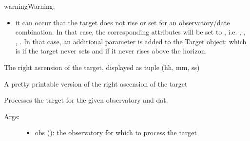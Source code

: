 \documentclass[letterpaper,10pt,english]{sphinxmanual}
\begin{document}
\begin{fulllineitems}
\begin{fulllineitems}
\begin{description}
\begin{itemize}
\end{itemize}

\end{description}

\begin{notice}{warning}{Warning:}\begin{itemize}
\item {} 
it can occur that the target does not rise or set for an observatory/date combination. In that case, the corresponding attributes will be set to , i.e. , , , . In that case, an additional parameter is added to the Target object:  which is  if the target never sets and  if it never rises above the horizon.

\end{itemize}
\end{notice}

\end{fulllineitems}


\begin{fulllineitems}
\label{astroobs:astroobs.Target.Target.ra}
The right ascension of the target, displayed as tuple (hh, mm, ss)

\end{fulllineitems}


\begin{fulllineitems}
\label{astroobs:astroobs.Target.Target.raStr}
A pretty printable version of the right ascension of the target

\end{fulllineitems}


\begin{fulllineitems}
\label{astroobs:astroobs.Target.Target.whenobs}
Processes the target for the given observatory and dat.
\begin{description}
\item[{Args:}] \leavevmode\begin{itemize}
\item {} 
obs (): the observatory for which to process the target


\end{itemize}
\end{description}
\end{fulllineitems}
\end{fulllineitems}
\end{document}
